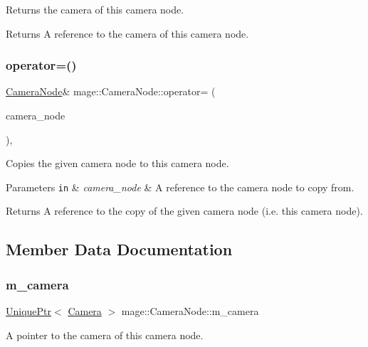 Returns the camera of this camera node.

\begin{DoxyReturn}{Returns}
A reference to the camera of this camera node. 
\end{DoxyReturn}
\hypertarget{classmage_1_1_camera_node_a03442d51e4279717f6692e0a731967a1}{}\label{classmage_1_1_camera_node_a03442d51e4279717f6692e0a731967a1} 
\subsubsection{\texorpdfstring{operator=()}{operator=()}}
{\footnotesize\ttfamily \hyperlink{classmage_1_1_camera_node}{Camera\+Node}\& mage\+::\+Camera\+Node\+::operator= (\begin{DoxyParamCaption}\item[{const \hyperlink{classmage_1_1_camera_node}{Camera\+Node} \&}]{camera\+\_\+node }\end{DoxyParamCaption})\hspace{0.3cm}{\ttfamily [private]}, {\ttfamily [delete]}}

Copies the given camera node to this camera node.


\begin{DoxyParams}[1]{Parameters}
\mbox{\tt in}  & {\em camera\+\_\+node} & A reference to the camera node to copy from. \\
\hline
\end{DoxyParams}
\begin{DoxyReturn}{Returns}
A reference to the copy of the given camera node (i.\+e. this camera node). 
\end{DoxyReturn}


\subsection{Member Data Documentation}
\hypertarget{classmage_1_1_camera_node_a18f00f7ccd0c677043e11a1b3085dbfb}{}\label{classmage_1_1_camera_node_a18f00f7ccd0c677043e11a1b3085dbfb} 
\subsubsection{\texorpdfstring{m\+\_\+camera}{m\_camera}}
{\footnotesize\ttfamily \hyperlink{namespacemage_a8c307fbcc33bce9b7f2aa4c26c3b95cf}{Unique\+Ptr}$<$ \hyperlink{classmage_1_1_camera}{Camera} $>$ mage\+::\+Camera\+Node\+::m\+\_\+camera\hspace{0.3cm}{\ttfamily [protected]}}

A pointer to the camera of this camera node. 